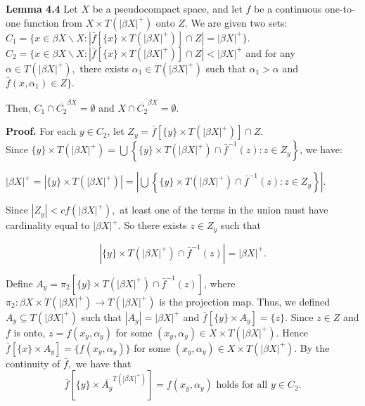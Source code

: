 \documentclass{article}
\begin{document}
																															    \vskip 40pt




																															    \textbf{Lemma 4.4} Let $X$ be a pseudocompact space, and let $f$ be a continuous one-to-one function from $X\times T(|\beta X|^+)$ onto $Z$. We are given two sets: \\
																																$C_1=\{x\in \beta X\backslash X: \left|\bar{f}[\{x\}\times T(|\beta X|^+)]\cap Z\right|=|\beta X|^+\}.$\\
																																$C_2=\{x\in \beta X\backslash X: \left|\bar{f}[\{x\}\times T(|\beta X|^+)]\cap Z\right|<|\beta X|^+ $ and for any $\alpha\in T(|\beta X|^+),$ there exists $\alpha_1\in T(|\beta X|^+)$ such that $\alpha_1 >\alpha$ and $\bar{f}(x,\alpha_1) \in Z \}.$

																																Then, $C_1\cap \overline{C_2}^{\beta X}=\emptyset$ and $X\cap \overline{C_2}^{\beta X}=\emptyset$.

																																\vskip 15pt

																																\textbf{Proof.} 
																																For each $y\in C_2$, let $Z_y=\bar{f}\left[\{y\}\times T(|\beta X|^+)\right] \cap Z$. \\
																																			      Since $\{y\}\times T(|\beta X|^+) = \bigcup \left\{ \{y\} \times T(|\beta X|^+) \cap \bar{f}^{-1}(z):z\in Z_y \right\}$, we have:
																																			      \begin{center}
																																			      $\left|\beta X\right|^+ =\left| \{y\}\times T(|\beta X|^+)\right| = \left| \bigcup \left\{ \{y\} \times T(|\beta X|^+) \cap \bar{f}^{-1}(z):z\in Z_y \right\}\right|.$
																																			      \end{center}
																																			      Since $\left|Z_y\right|< cf(\left|\beta X\right|^+),$ at least one of the terms in the union must have cardinality equal to $\left|\beta X\right|^+$. So there exists $z\in Z_y$ such that 

																																			      $$\left|  \{y\} \times T(|\beta X|^+) \cap \bar{f}^{-1}(z) \right|=\left|\beta X\right|^+.$$ 

																																			      \vskip 15pt

																																			      Define $A_y=\pi_2 \left[ \{y\} \times T(|\beta X|^+) \cap \bar{f}^{-1}(z) \right]$, where $\pi_2: \beta X \times 
																																			      T(|\beta X|^+) \rightarrow T(|\beta X|^+)$ is the projection map. Thus, we defined $A_y\subseteq T(\left|\beta X\right|^+)$ such that $\left|A_y\right|=\left|\beta X\right|^+$ and $\bar{f}[\{y\}\times A_y]=\{z\}.$ Since $z\in Z$ and $f$ is onto, $z=f(x_y,\alpha_y)$ for some $(x_y,\alpha_y)\in X\times T(|\beta X|^+).$ Hence $\bar{f}\left[\{x\}\times A_y\right]=\{f(x_y,\alpha_y)\}$ for some $(x_y, \alpha_y)\in X\times T(|\beta X|^+).$ By the continuity of $\bar{f},$ we have that $$\bar{f}\left[\{y\}\times \overline{A_y}^{T(|\beta X|^+)}\right]=f(x_y,\alpha_y) \mbox{ holds for all } y \in C_2.$$
\end{document}
